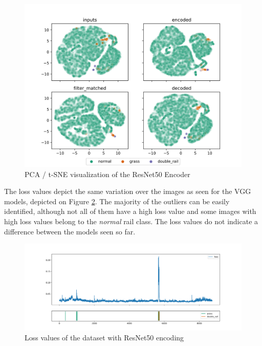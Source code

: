 \begin{figure}[!ht]
    \centering
    \includegraphics[width=\textwidth,trim={0 0 0 1cm},clip]{./results/resnet50_vgg19/20230514_213740_feature_vectors_1.png}
    \caption{PCA / t-SNE visualization of the ResNet50 Encoder}
    \label{fig:resnet50_pca}
\end{figure}

The loss values depict the same variation over the images as seen for the VGG models,
depicted on Figure \ref{fig:resnet50_loss}.
The majority of the outliers can be easily identified, although not all of them have a high loss value
and some images with high loss values belong to the \emph{normal} rail class.
The loss values do not indicate a difference between the models seen so far.

\begin{figure}[!ht]
    \centering
    \includegraphics[width=\textwidth,trim={0 1cm 0 1cm},clip]{./results/resnet50_vgg19/20230514_213740_feature_vectors_loss.png}
    \caption{Loss values of the dataset with ResNet50 encoding}
    \label{fig:resnet50_loss}
\end{figure}

